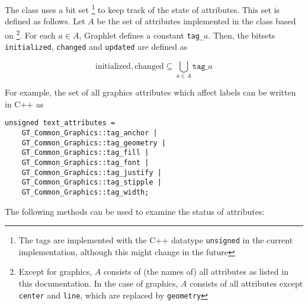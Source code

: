 \documentclass[twoside,fleqn]{report}
\begin{document}
\noindent The class  uses a bit set
\footnote{The tags are implemented with the C++ datatype
  \texttt{unsigned} in the current implementation, although this
  might change in the future} to keep track of the state of
attributes.  This set is defined as follows. Let $A$ be the set
of attributes implemented in the class based on
\footnote{Except for graphics, $A$
  consists of (the names of) all attributes as listed in this
  documentation. In the case of graphics, $A$ consists of all
  attributes except \texttt{center} and \texttt{line}, which are
  replaced by \texttt{geometry}}. For each $a \in A$, Graphlet
defines a constant \texttt{tag\_}$a$. Then, the bitsets
\texttt{initialized}, \texttt{changed} and \texttt{updated} are
defined as

\[
\mbox{initialized}, \mbox{changed}
\subseteq
\bigcup_{a \in A} \mathtt{tag\_}a
\]

\noindent For example, the set of all graphics attributes which affect labels 
can be written in C++ as

\begin{verbatim}
unsigned text_attributes =
    GT_Common_Graphics::tag_anchor |
    GT_Common_Graphics::tag_geometry |
    GT_Common_Graphics::tag_fill |
    GT_Common_Graphics::tag_font |
    GT_Common_Graphics::tag_justify |
    GT_Common_Graphics::tag_stipple |
    GT_Common_Graphics::tag_width;
\end{verbatim}

\noindent The following methods can be used to examine the status of
attributes:
\end{document}

